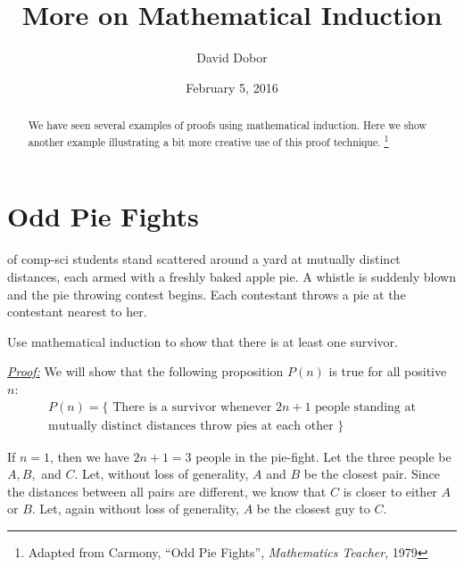 \documentclass{tufte-handout}
\title{More on Mathematical Induction}
\author{David Dobor}
\date{February 5, 2016} %
\begin{document}
\maketitle%

\begin{abstract}
\noindent We have seen several examples of proofs using mathematical induction. Here we show another example illustrating a bit more creative use of this proof technique. \thanks{Adapted from Carmony, ``Odd Pie Fights'', \textit{Mathematics Teacher}, 1979}

\end{abstract}

\bigskip
\section{Odd Pie Fights}
 of comp-sci students stand scattered around a yard at mutually distinct distances, each armed with a freshly baked apple pie. A whistle is suddenly blown and the pie throwing contest begins. Each contestant throws a pie at the contestant nearest to her. 

\bigskip
Use mathematical induction to show that there is at least one survivor. 

\bigskip
\textit{\underline{Proof:} } We will show that the following proposition $P(n)$ is true for all positive $n$:
\let\thefootnote\relax{}
 \begin{equation*}
 \begin{aligned}
P(n) = \{ \text{ There is a survivor whenever } 2n + 1  \text{ people standing at} \\ 
                                                       \text{mutually distinct distances throw pies at each other }\}
\end{aligned}
\end{equation*}


 If $n = 1$, then we have $2n + 1 = 3$ people in the pie-fight. Let the three people be $A, B,$ and $C$. Let, without loss of generality, $A$ and $B$ be the closest pair.  Since the distances between all pairs  are different, we know that $C$ is closer to either $A$ or $B$. Let, again without loss of generality, $A$ be the closest guy to $C$. 
\end{document}
